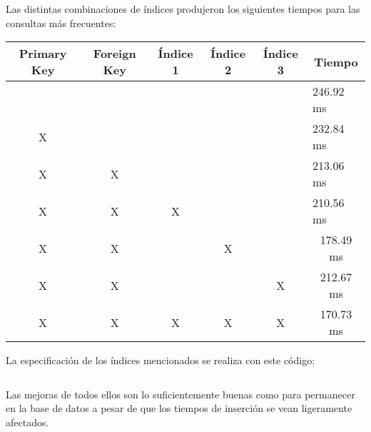 \documentclass[a4paper, 11pt, oneside]{article} %
\newcommand{\scriptdir}{../scripts/} %
\begin{document}
Las distintas combinaciones de índices produjeron los siguientes tiempos para las consultas más frecuentes:

\begin{table}[H]
\centering
\begin{tabular}{|c|c|c|l|l|l|}
\hline
Primary Key            & Foreign Key           & Índice 1              & \multicolumn{1}{c|}{Índice 2} & \multicolumn{1}{c|}{Índice 3} & \multicolumn{1}{c|}{Tiempo}    \\ \hline
\multicolumn{1}{|l|}{} & \multicolumn{1}{l|}{} & \multicolumn{1}{l|}{} &                               &                               & 246.92 ms                      \\ \hline
X                      & \multicolumn{1}{l|}{} & \multicolumn{1}{l|}{} &                               &                               & 232.84 ms                      \\ \hline
X                      & X                     & \multicolumn{1}{l|}{} &                               &                               & 213.06 ms                      \\ \hline
X                      & X                     & X                     &                               &                               & 210.56 ms                      \\ \hline
X                      & X                     &                       & \multicolumn{1}{c|}{X}        & \multicolumn{1}{c|}{}         & \multicolumn{1}{c|}{178.49 ms} \\ \hline
X                      & X                     &                       & \multicolumn{1}{c|}{}         & \multicolumn{1}{c|}{X}        & \multicolumn{1}{c|}{212.67 ms} \\ \hline
X                      & X                     & X                     & \multicolumn{1}{c|}{X}        & \multicolumn{1}{c|}{X}        & \multicolumn{1}{c|}{170.73 ms} \\ \hline
\end{tabular}
\end{table}

La especificación de los índices mencionados se realiza con este código:

\inputminted{mysql}{\scriptdir consultas/setIndices.sql}

Las mejoras de todos ellos son lo suficientemente buenas como para permanecer en la base de datos a pesar de que los tiempos de inserción se vean ligeramente afectados.
\end{document}
